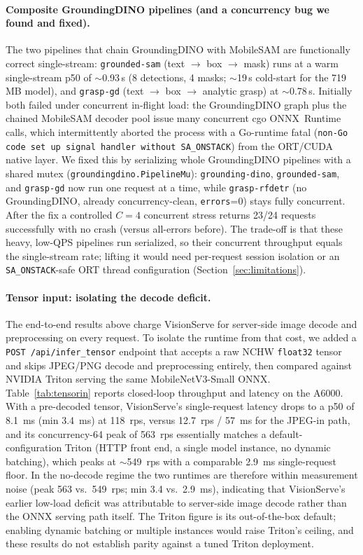 \paragraph{Composite GroundingDINO pipelines (and a concurrency bug we found and fixed).}
The two pipelines that chain GroundingDINO with MobileSAM are functionally correct single-stream:
\texttt{grounded-sam} (text $\to$ box $\to$ mask) runs at a warm single-stream p50 of $\sim$0.93\,s
(8 detections, 4 masks; $\sim$19\,s cold-start for the 719\,MB model), and \texttt{grasp-gd}
(text $\to$ box $\to$ analytic grasp) at $\sim$0.78\,s.  Initially both failed under
concurrent in-flight load: the GroundingDINO graph plus the chained MobileSAM decoder pool issue
many concurrent cgo ONNX~Runtime calls, which intermittently aborted the process with a Go-runtime
fatal (\texttt{non-Go code set up signal handler without SA\_ONSTACK}) from the ORT/CUDA native
layer.  We fixed this by serializing whole GroundingDINO pipelines with a shared mutex
(\texttt{groundingdino.PipelineMu}): \texttt{grounding-dino}, \texttt{grounded-sam}, and
\texttt{grasp-gd} now run one request at a time, while \texttt{grasp-rfdetr} (no GroundingDINO,
already concurrency-clean, \texttt{errors}=0) stays fully concurrent.  After the fix a controlled
$C{=}4$ concurrent stress returns 23/24 requests successfully with no crash (versus all-errors
before).  The trade-off is that these heavy, low-QPS pipelines run
serialized, so their concurrent throughput equals the single-stream rate; lifting it would
need per-request session isolation or an \texttt{SA\_ONSTACK}-safe ORT thread configuration
(Section~\ref{sec:limitations}).

\paragraph{Tensor input: isolating the decode deficit.}
The end-to-end results above charge VisionServe for server-side image decode and
preprocessing on every request.  To isolate the runtime from that cost, we added a
\texttt{POST /api/infer\_tensor} endpoint that accepts a raw NCHW \texttt{float32}
tensor and skips JPEG/PNG decode and preprocessing entirely, then compared against
NVIDIA Triton serving the same MobileNetV3-Small ONNX.  Table~\ref{tab:tensorin}
reports closed-loop throughput and latency on the A6000.  With a pre-decoded tensor,
VisionServe's single-request latency drops to a p50 of 8.1~ms (min 3.4~ms) at 118~rps,
versus 12.7~rps / 57~ms for the JPEG-in path, and its concurrency-64 peak of 563~rps
essentially matches a default-configuration Triton (HTTP front end, a single
model instance, no dynamic batching), which peaks at $\sim$549~rps with a comparable
2.9~ms single-request floor.  In the no-decode regime the two runtimes are therefore
within measurement noise (peak 563 vs.\ 549~rps; min 3.4 vs.\ 2.9~ms), indicating that
VisionServe's earlier low-load deficit was attributable to server-side image decode
rather than the ONNX serving path itself.  The Triton figure is its
out-of-the-box default; enabling dynamic batching or multiple instances would raise
Triton's ceiling, and these results do not establish parity against a tuned Triton deployment.

